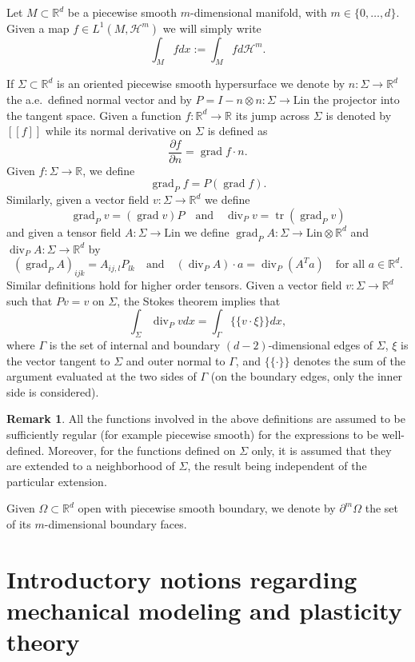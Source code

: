 \documentclass[a4paper,10pt,twoside]{amsbook}
\numberwithin{section}{chapter}
\numberwithin{equation}{chapter}
\theoremstyle{definition}
\newtheorem*{rmk*}{Remark}
\DeclareMathOperator{\diver}{div}
\DeclareMathOperator{\tr}{tr}
\DeclareMathOperator{\grad}{grad}
\newcommand{\dind}[2]{\frac{\partial #1}{\partial #2}}
\begin{document}
Let $M\subset\mathbb{R}^d$ be a piecewise smooth $m$-dimensional manifold, with $m\in\{0,\dots,d\}$. Given a map $f\in L^1(M,\mathcal{H}^m)$ we will simply write
\[
\int_Mfdx:=\int_Mfd\mathcal{H}^m.
\]

If $\Sigma\subset\mathbb{R}^d$ is an oriented piecewise smooth hypersurface we denote by $n\colon\Sigma\to\mathbb{R}^d$ the a.e.\ defined normal vector and by $P=I-n\otimes n\colon\Sigma\to\text{Lin}$ the projector into the tangent space. Given a function $f\colon\mathbb{R}^d\to\mathbb{R}$ its jump across $\Sigma$ is denoted by $[\![f]\!]$ while its normal derivative on $\Sigma$ is defined as
\[
\dind{f}{n}=\grad f\cdot n. 
\]
Given $f\colon\Sigma\to\mathbb{R}$, we define
\[
\grad_Pf=P(\grad f).
\]
Similarly, given a vector field $v\colon\Sigma\to\mathbb{R}^d$ we define
\[
\grad_P v=(\grad v)P\quad\text{and}\quad\diver_P v=\tr(\grad_P v)
\]
and given a tensor field $A\colon\Sigma\to\text{Lin}$ we define $\grad_PA\colon\Sigma\to\text{Lin}\otimes\mathbb{R}^d$ and $\diver_PA\colon\Sigma\to\mathbb{R}^d$ by
\[
(\grad_PA)_{ijk}=A_{ij,l}P_{lk}\quad\text{and}\quad(\diver_PA)\cdot a=\diver_P(A^Ta)\quad\text{for all $a\in\mathbb{R}^d$.}
\]
Similar definitions hold for higher order tensors. Given a vector field $v\colon\Sigma\to\mathbb{R}^d$ such that $Pv=v$ on $\Sigma$, the Stokes theorem implies that 
\[
\int_\Sigma\diver_Pvdx=\int_\Gamma\{\!\!\{v\cdot\xi\}\!\!\}dx,
\]
where $\Gamma$ is the set of internal and boundary $(d-2)$-dimensional edges of $\Sigma$, $\xi$ is the vector tangent to $\Sigma$ and outer normal to $\Gamma$, and $\{\!\!\{\cdot\}\!\!\}$ denotes the sum of the argument evaluated at the two sides of $\Gamma$ (on the boundary edges, only the inner side is considered).
\begin{rmk*}
All the functions involved in the above definitions are assumed to be sufficiently regular (for example piecewise smooth) for the expressions to be well-defined. Moreover, for the functions defined on $\Sigma$ only, it is assumed that they are extended to a neighborhood of $\Sigma$, the result being independent of the particular extension.
\end{rmk*}

Given $\Omega\subset\mathbb{R}^d$ open with piecewise smooth boundary, we denote by $\partial^m\Omega$ the set of its $m$-dimensional boundary faces.

\chapter{Introductory notions regarding mechanical modeling and plasticity theory}
\label{chap:modeling}
\end{document}
